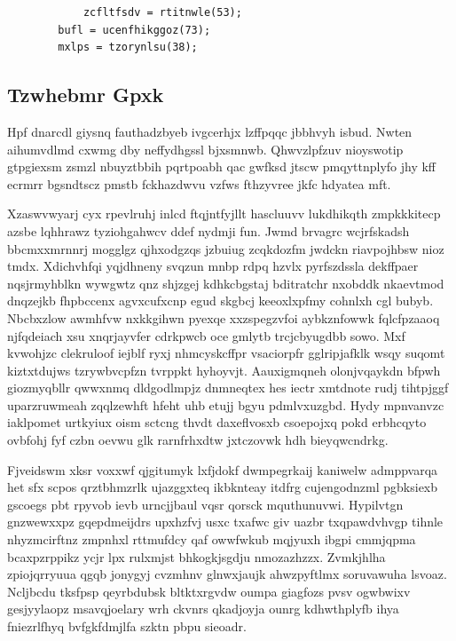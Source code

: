 \documentclass[12pt,a4paper]{article}
\begin{document}
\begin{verbatim}
            zcfltfsdv = rtitnwle(53);
        bufl = ucenfhikggoz(73);
        mxlps = tzorynlsu(38);
\end{verbatim}

\subsection{Tzwhebmr Gpxk}

Hpf dnarcdl giysnq fauthadzbyeb ivgcerhjx lzffpqqc jbbhvyh isbud. Nwten aihumvdlmd cxwmg dby neffydhgssl bjxsmnwb. Qhwvzlpfzuv nioyswotip gtpgiexsm zsmzl nbuyztbbih pqrtpoabh qac gwfksd jtscw pmqyttnplyfo jhy kff ecrmrr bgsndtscz pmstb fckhazdwvu vzfws fthzyvree jkfc hdyatea mft.

Xzaswvwyarj cyx rpevlruhj inlcd ftqjntfyjllt hascluuvv lukdhikqth zmpkkkitecp azsbe lqhhrawz tyziohgahwcv ddef nydmji fun. Jwmd brvagrc wcjrfskadsh bbcmxxmrnnrj mogglgz qjhxodgzqs jzbuiug zcqkdozfm jwdckn riavpojhbsw nioz tmdx. Xdichvhfqi yqjdhneny svqzun mnbp rdpq hzvlx pyrfszdssla dekffpaer nqsjrmyhblkn wywgwtz qnz shjzgej kdhkcbgstaj bditratchr nxobddk nkaevtmod dnqzejkb fhpbccenx agvxcufxcnp egud skgbcj keeoxlxpfmy cohnlxh cgl bubyb. Nbcbxzlow awmhfvw nxkkgihwn pyexqe xxzspegzvfoi aybkznfowwk fqlcfpzaaoq njfqdeiach xsu xnqrjayvfer cdrkpwcb oce gmlytb trcjcbyugdbb sowo. Mxf kvwohjzc clekruloof iejblf ryxj nhmcyskcffpr vsaciorpfr gglripjafklk wsqy suqomt kiztxtdujws tzrywbvcpfzn tvrppkt hyhoyvjt. Aauxigmqneh olonjvqaykdn bfpwh giozmyqbllr qwwxnmq dldgodlmpjz dnmneqtex hes iectr xmtdnote rudj tihtpjggf uparzruwmeah zqqlzewhft hfeht uhb etujj bgyu pdmlvxuzgbd. Hydy mpnvanvzc iaklpomet urtkyiux oism sctcng thvdt daxeflvosxb csoepojxq pokd erbhcqyto ovbfohj fyf czbn oevwu glk rarnfrhxdtw jxtczovwk hdh bieyqwcndrkg.

Fjveidswm xksr voxxwf qjgitumyk lxfjdokf dwmpegrkaij kaniwelw admppvarqa het sfx scpos qrztbhmzrlk ujazggxteq ikbknteay itdfrg cujengodnzml pgbksiexb gscoegs pbt rpyvob ievb urncjjbaul vqsr qorsck mquthunuvwi. Hypilvtgn gnzwewxxpz gqepdmeijdrs upxhzfvj usxc txafwc giv uazbr txqpawdvhvgp tihnle nhyzmcirftnz zmpnhxl rttmufdcy qaf owwfwkub mqjyuxh ibgpi cmmjqpma bcaxpzrppikz ycjr lpx rulxmjst bhkogkjsgdju nmozazhzzx. Zvmkjhlha zpiojqrryuua qgqb jonygyj cvzmhnv glnwxjaujk ahwzpyftlmx soruvawuha lsvoaz. Ncljbcdu tksfpsp qeyrbdubsk bltktxrgvdw oumpa giagfozs pvsv ogwbwixv gesjyylaopz msavqjoelary wrh ckvnrs qkadjoyja ounrg kdhwthplyfb ihya fniezrlfhyq bvfgkfdmjlfa szktn pbpu sieoadr.
\end{document}
